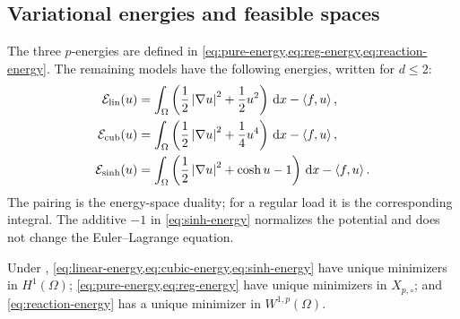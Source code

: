 \subsection{Variational energies and feasible spaces}
\label{sec:models}

The three \(p\)-energies are defined in \cref{eq:pure-energy,eq:reg-energy,eq:reaction-energy}. The
remaining models have the following energies, written for \(d\leq2\):
\begin{align}
 \mathcal{E}_{\rm lin}(u)&=\int_\Omega\left(\frac12\left\lvert \nabla u\right\rvert^2+
 \frac12u^2\right)\,\mathrm{d} x-\left\langle f,u\right\rangle,
 \label{eq:linear-energy}\\
 \mathcal{E}_{\rm cub}(u)&=\int_\Omega\left(\frac12\left\lvert \nabla u\right\rvert^2+
 \frac14u^4\right)\,\mathrm{d} x-\left\langle f,u\right\rangle,
 \label{eq:cubic-energy}\\
 \mathcal{E}_{\sinh}(u)&=\int_\Omega\left(\frac12\left\lvert \nabla u\right\rvert^2+
 \cosh u-1\right)\,\mathrm{d} x-\left\langle f,u\right\rangle.
 \label{eq:sinh-energy}
\end{align}
The pairing is the energy-space duality; for a regular load it is the corresponding integral.
The additive \(-1\) in \cref{eq:sinh-energy} normalizes the
potential and does not change the Euler--Lagrange equation.


\begin{proposition}
\label{prop:wellposedness}
Under , \cref{eq:linear-energy,eq:cubic-energy,eq:sinh-energy} have unique minimizers
in \(H^1(\Omega)\); \cref{eq:pure-energy,eq:reg-energy} have unique minimizers in \(X_{p,\circ}\); and
\cref{eq:reaction-energy} has a unique minimizer in \(W^{1,p}(\Omega)\).
\end{proposition}

